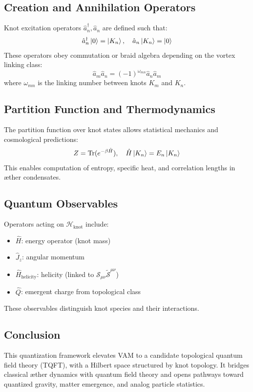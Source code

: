 \documentclass[a4paper,12pt]{article}
\begin{document}
    \subsection{Creation and Annihilation Operators}
    Knot excitation operators $\hat{a}_n^\dagger, \hat{a}_n$ are defined such that:
    \begin{equation}
        \hat{a}_n^\dagger \ket{0} = \ket{K_n}, \quad \hat{a}_n \ket{K_n} = \ket{0}
    \end{equation}
    These operators obey commutation or braid algebra depending on the vortex linking class:
    \begin{equation}
        \hat{a}_m \hat{a}_n = (-1)^{\omega_{mn}} \hat{a}_n \hat{a}_m
    \end{equation}
    where $\omega_{mn}$ is the linking number between knots $K_m$ and $K_n$.

    \subsection{Partition Function and Thermodynamics}
    The partition function over knot states allows statistical mechanics and cosmological predictions:
    \begin{equation}
        Z = \text{Tr}(e^{-\beta \hat{H}}), \quad \hat{H} \ket{K_n} = E_n \ket{K_n}
    \end{equation}
    This enables computation of entropy, specific heat, and correlation lengths in æther condensates.

    \subsection{Quantum Observables}
    Operators acting on $\mathcal{H}_{\text{knot}}$ include:
    \begin{itemize}
        \item $\hat{H}$: energy operator (knot mass)
        \item $\hat{J}_z$: angular momentum
        \item $\hat{H}_\text{helicity}$: helicity (linked to $\mathcal{S}_{\mu\nu} \tilde{\mathcal{S}}^{\mu\nu}$)
        \item $\hat{Q}$: emergent charge from topological class
    \end{itemize}
    These observables distinguish knot species and their interactions.

    \subsection{Conclusion}
    This quantization framework elevates VAM to a candidate topological quantum field theory (TQFT), with a Hilbert space structured by knot topology. It bridges classical æther dynamics with quantum field theory and opens pathways toward quantized gravity, matter emergence, and analog particle statistics.
\end{document}
